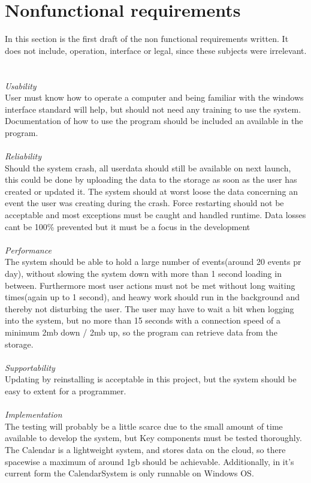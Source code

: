 \section{Nonfunctional requirements}

In this section is the first draft of the non functional requirements written. It does not include, operation, interface or legal, since these subjects were irrelevant.
\\ 
\\
\HRule \\[0.4cm]
\emph{Usability} \\ 
User must know how to operate a computer and being familiar with the windows interface standard will help, but should not need any training to use the system. Documentation of how to use the program should be included an available in the program. \\
\HRule \\[0.4cm]
\emph{Reliability} \\
Should the system crash, all userdata should still be available on next launch, this could be done by uploading the data to the storage as soon as the user has created or updated it. The system should at worst loose the data concerning an event the user was creating during the crash. Force restarting should not be acceptable and most exceptions must be caught and handled runtime. Data losses cant be 100\% prevented but it must be a focus in the development\\
\HRule \\[0.4cm]
\emph{Performance} \\
The system should be able to hold a large number of events(around 20 events pr day), without slowing the system down with more than 1 second loading in between. Furthermore most user actions must not be met without long waiting times(again up to 1 second), and heawy work should run in the background and thereby not disturbing the user.  The user may have to wait a bit when logging into the system, but no more than 15 seconds with a connection speed of a minimum 2mb down / 2mb up, so the program can retrieve data from the storage. \\
\HRule \\[0.4cm]
\emph{Supportability} \\
Updating by reinstalling is acceptable in this project, but the system should be easy to extent for a programmer.\\
\HRule \\[0.4cm]
\emph{Implementation}\\
The testing will probably be a little scarce due to the small amount of time available to develop the system, but Key components must be tested thoroughly.  The Calendar is a lightweight system, and stores data on the cloud, so there spacewise a maximum of around 1gb should be achievable. Additionally, in it's current form the CalendarSystem is only runnable on Windows OS.\\
\HRule \\[0.4cm]

\newpage